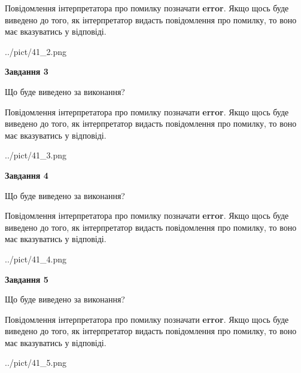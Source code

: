 \documentclass[12pt, ukrainian]{article}
\begin{document}
{\begin {large}
Повідомлення інтерпретатора про помилку позначати \textbf{error}.
Якщо щось буде виведено до того, як інтерпретатор видасть повідомлення про помилку, 
то воно має вказуватись у відповіді. \par


\begin{center}
	{../pict/41_2.png}
\end{center}
\newpage

{\begin {center}\textbf{Завдання 3}\end {center}}\par
Що буде виведено за виконання?

Повідомлення інтерпретатора про помилку позначати \textbf{error}.
Якщо щось буде виведено до того, як інтерпретатор видасть повідомлення про помилку, 
то воно має вказуватись у відповіді. \par


\begin{center}
	{../pict/41_3.png}
\end{center}
\newpage

{\begin {center}\textbf{Завдання 4}\end {center}}\par
Що буде виведено за виконання?

Повідомлення інтерпретатора про помилку позначати \textbf{error}.
Якщо щось буде виведено до того, як інтерпретатор видасть повідомлення про помилку, 
то воно має вказуватись у відповіді. \par


\begin{center}
	{../pict/41_4.png}
\end{center}
\newpage

{\begin {center}\textbf{Завдання 5}\end {center}}\par
Що буде виведено за виконання?

Повідомлення інтерпретатора про помилку позначати \textbf{error}.
Якщо щось буде виведено до того, як інтерпретатор видасть повідомлення про помилку, 
то воно має вказуватись у відповіді. \par


\begin{center}
	{../pict/41_5.png}
\end{center}
\newpage


\end{large}}
\end{document}
